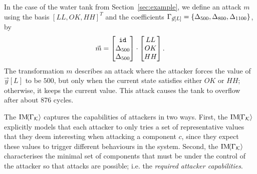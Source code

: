 {{\begin{example}
  \label{ex:attack}
  In the case of the water tank from Section~\ref{sec:example}, we define an attack $m$ using the basis $[LL, OK, HH]^T$ and the coefficients $\Gamma_{\vec{y}[L]}=\left\{{\Delta}_{500}, {\Delta}_{800},  {\Delta}_{1100}\right\}$, by
\begin{align}
  \vec{m}=
  \begin{bmatrix}
    {\texttt{id}} \\
    {\Delta}_{500} \\
    {\Delta}_{500}
  \end{bmatrix}
  \cdot
  \begin{bmatrix}
    LL \\
    OK\\
    HH
  \end{bmatrix}.
\end{align}
The transformation $m$ describes an attack where the attacker forces the value of $\vec{y}[L]$ to be $500$, but only when the current state satisfies either $OK$ or $HH$; otherwise, it keeps the current value. This attack causes the tank to overflow after about 876 cycles.
\end{example}
The $\text{IM}\!{{\left<\Gamma_{\mathcal{K}}\right>}}$ captures the capabilities of attackers in two ways. First, the $\text{IM}\!{{\left<\Gamma_{\mathcal{K}}\right>}}$ explicitly models that each attacker to only tries a set of representative values that they deem interesting when attacking a component $c$, since they expect these values to trigger different behaviours in the system. Second, the $\text{IM}\!{{\left<\Gamma_{\mathcal{K}}\right>}}$ characterises the minimal set of components that must be under the control of the attacker so that attacks are possible; i.e. the \emph{required attacker capabilities}.

}}
